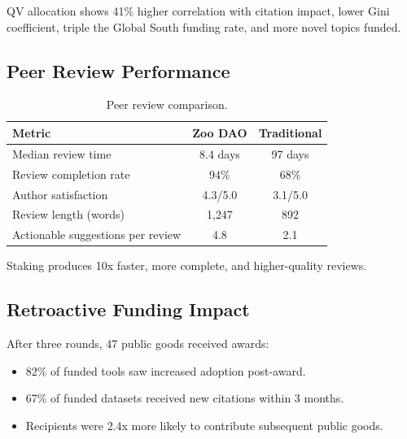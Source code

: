 QV allocation shows 41\% higher correlation with citation impact, lower
Gini coefficient, triple the Global South funding rate, and more novel
topics funded.

\subsection{Peer Review Performance}

\begin{table}[H]
\centering
\caption{Peer review comparison.}
\label{tab:review_compare}
\begin{tabular}{lcc}
\toprule
\textbf{Metric} & \textbf{Zoo DAO} & \textbf{Traditional} \\
\midrule
Median review time & 8.4 days & 97 days \\
Review completion rate & 94\% & 68\% \\
Author satisfaction & 4.3/5.0 & 3.1/5.0 \\
Review length (words) & 1{,}247 & 892 \\
Actionable suggestions per review & 4.8 & 2.1 \\
\bottomrule
\end{tabular}
\end{table}

Staking produces 10x faster, more complete, and higher-quality reviews.

\subsection{Retroactive Funding Impact}

After three rounds, 47 public goods received awards:
\begin{itemize}
  \item 82\% of funded tools saw increased adoption post-award.
  \item 67\% of funded datasets received new citations within 3 months.
  \item Recipients were 2.4x more likely to contribute subsequent
    public goods.
\end{itemize}


